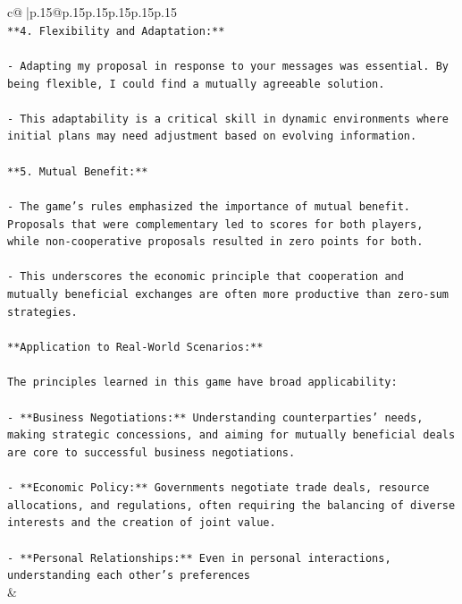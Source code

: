 \documentclass{article}
\begin{document}
{\begin{supertabular}{c@{$\;$}|p{.15\linewidth}@{}p{.15\linewidth}p{.15\linewidth}p{.15\linewidth}p{.15\linewidth}p{.15\linewidth}}
{{{\\ 
\texttt{**4. Flexibility and Adaptation:**} \\
\\ 
\texttt{{-} Adapting my proposal in response to your messages was essential. By being flexible, I could find a mutually agreeable solution.} \\
\\ 
\texttt{{-} This adaptability is a critical skill in dynamic environments where initial plans may need adjustment based on evolving information.} \\
\\ 
\texttt{**5. Mutual Benefit:**} \\
\\ 
\texttt{{-} The game's rules emphasized the importance of mutual benefit. Proposals that were complementary led to scores for both players, while non{-}cooperative proposals resulted in zero points for both.} \\
\\ 
\texttt{{-} This underscores the economic principle that cooperation and mutually beneficial exchanges are often more productive than zero{-}sum strategies.} \\
\\ 
\texttt{**Application to Real{-}World Scenarios:**} \\
\\ 
\texttt{The principles learned in this game have broad applicability:} \\
\\ 
\texttt{{-} **Business Negotiations:** Understanding counterparties' needs, making strategic concessions, and aiming for mutually beneficial deals are core to successful business negotiations.} \\
\\ 
\texttt{{-} **Economic Policy:** Governments negotiate trade deals, resource allocations, and regulations, often requiring the balancing of diverse interests and the creation of joint value.} \\
\\ 
\texttt{{-} **Personal Relationships:** Even in personal interactions, understanding each other's preferences} \\
            }
        }
    }
    & \\ \\


\end{supertabular}}
\end{document}
